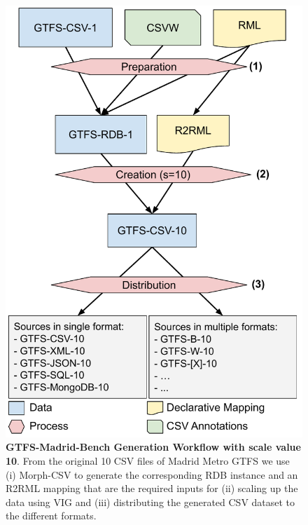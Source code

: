 \begin{figure}
    \centering
    \includegraphics[width=0.7\linewidth]{figures/gprocess.pdf}
    \caption[Generation workflow for scale value 10]{\textbf{GTFS-Madrid-Bench Generation Workflow with scale value 10}. From the original 10 CSV files of Madrid Metro GTFS we use (i) Morph-CSV to generate the corresponding RDB instance and an R2RML mapping that are the required inputs for (ii) scaling up the data using VIG and (iii) distributing the generated CSV dataset to the different formats.}
    \label{fig:generation}
\end{figure}


